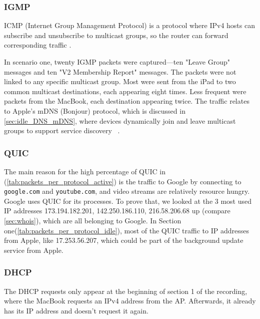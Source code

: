 \documentclass[sigconf,nonacm]{acmart}
\begin{document}
\subsubsection{IGMP}
\label{sec:igmp}
ICMP (Internet Group Management Protocol) is a protocol where IPv4 hosts can subscribe and unsubscribe to multicast groups, so the router can forward corresponding traffic \cite{rfc2236}.

In scenario one, twenty IGMP packets were captured—ten "Leave Group" messages and ten "V2 Membership Report" messages. The packets were not linked to any specific multicast group. Most were sent from the iPad to two common multicast destinations, each appearing eight times. Less frequent were packets from the MacBook, each destination appearing twice. The traffic relates to Apple's mDNS (Bonjour) protocol, which is discussed in \cref{sec:idle_DNS_mDNS}, where devices dynamically join and leave multicast groups to support service discovery ~\cite{so_multicast_224001251}.





\subsubsection{QUIC}
The main reason for the high percentage of QUIC in (\cref{tab:packets_per_protocol_active}) is the traffic to Google by connecting to \texttt{google.com} and \texttt{youtube.com}, and video streams are relatively resource hungry. Google uses QUIC for its processes. To prove that, we looked at the 3 most used IP addresses 173.194.182.201, 142.250.186.110, 216.58.206.68  up (compare \cref{sec:whois}), which are all belonging to Google. 
In Section one(\cref{tab:packets_per_protocol_idle}), most of the QUIC traffic to IP addresses from Apple, like 17.253.56.207, which could be part of the background update service from Apple.


\subsubsection{DHCP}
\label{sec:dhcp}
The DHCP requests only appear at the beginning of section 1 of the recording, where the MacBook requests an IPv4 address from the AP. Afterwards, it already has its IP address and doesn't request it again. 
\end{document}
